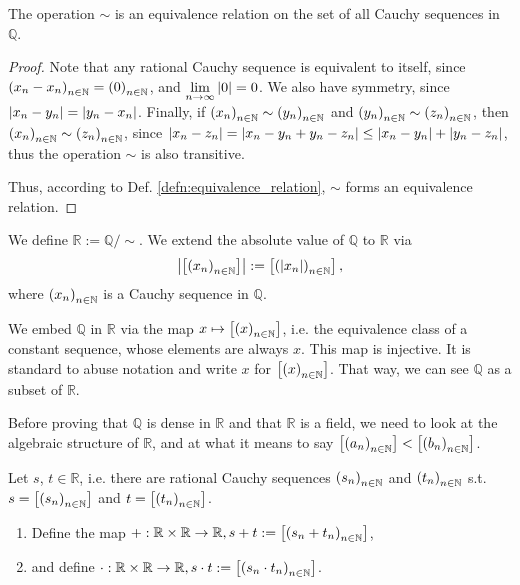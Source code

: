 \begin{theorem}
	The operation $\sim$ is an equivalence relation on the set of all Cauchy sequences in $\mathbb Q$.
\end{theorem}

\begin{proof}
	Note that any rational Cauchy sequence is equivalent to itself, since \\ $\seq[x_n - x_n] = \seq[0]$, and $\lim\limits_{n\to\infty}\abs{0} = 0$. We also have symmetry, since \\ $\abs{x_n - y_n} = \abs{y_n - x_n}$. Finally, if $\seq[x_n]\sim \seq[y_n]$ and $\seq[y_n]\sim \seq[z_n]$, then $\seq[x_n]\sim \seq[z_n]$, since $\abs{x_n - z_n} = \abs{x_n - y_n + y_n - z_n} \leq \abs{x_n - y_n} + \abs{y_n - z_n}$, thus the operation $\sim$ is also transitive.
	
	Thus, according to Def. \ref{defn:equivalence_relation}, $\sim$ forms an equivalence relation.
\end{proof}

\begin{defn}
	We define $\mathbb R := \mathbb Q / \sim$. We extend the absolute value of $\mathbb Q$ to $\mathbb R$ via
	\begin{align}
		\abs{\left[\seq[x_n]\right]} := \left[ \seq[\abs{x_n}] \right],
	\end{align}
	where $\seq[x_n]$ is a Cauchy sequence in $\mathbb Q$.
\end{defn}

\begin{remark}
	We embed $\mathbb Q$ in $\mathbb R$ via the map $x\mapsto \left[\seq[x]\right]$, i.e. the equivalence class of a constant sequence, whose elements are always $x$. This map is injective. It is standard to abuse notation and write $x$ for $\left[\seq[x]\right]$. That way, we can see $\mathbb Q$ as a subset of $\mathbb R$.
\end{remark}

Before proving that $\mathbb Q$ is dense in $\mathbb R$ and that $\mathbb R$ is a field, we need to look at the algebraic structure of $\mathbb R$, and at what it means to say $\left[\seq[a_n]\right] < \left[\seq[b_n]\right]$.

\begin{defn}\label{defn:addition_multiplication_R}
	Let $s$, $t\in\mathbb R$, i.e. there are rational Cauchy sequences $\seq[s_n]$ and $\seq[t_n]$ s.t. $s = \left[\seq[s_n]\right]$ and $t = \left[\seq[t_n]\right]$.
	\begin{enumerate}[label=\alph*)]
		\item Define the map $+: \mathbb R\times \mathbb R\to\mathbb R, s + t := \left[\seq[s_n + t_n]\right]$, 
		\item and define $\cdot: \mathbb R\times \mathbb R\to\mathbb R, s \cdot t := \left[\seq[s_n\cdot t_n]\right]$.
	\end{enumerate}
\end{defn}

